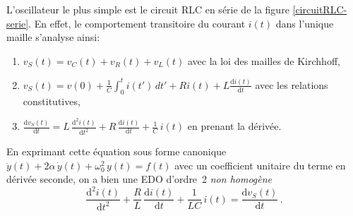 \documentclass[canadien,12pt,oneside,letterpaper]{article}
\begin{document}
L'oscillateur le plus simple est le circuit RLC en série de la figure \ref{circuitRLC-serie}. En effet, le comportement transitoire du courant $i(t)$ dans l'unique maille s'analyse ainsi:
\begin{enumerate}
    \item $v_S(t)=v_C(t)+v_R(t)+v_L(t)$ avec la loi des mailles de Kirchhoff,
    \item $\displaystyle v_S(t)=v(0)+\frac{1}{C}\int_0^ti(t')\,dt'+Ri(t)+L\frac{\mathrm{d}i(t)}{\mathrm{d}t}$ avec les relations constitutives,
  \item $\displaystyle \frac{\mathrm{d}v_S(t)}{\mathrm{d}t} = L\,\frac{\mathrm{d}^2i(t)}{\mathrm{d}t^2}+R\,\frac{\mathrm{d}i(t)}{\mathrm{d}t}+\frac{1}{C}\,i(t)$ en prenant la dérivée.
\end{enumerate}
En exprimant cette équation sous forme canonique $\ddot y(t) + 2\alpha\,\dot y(t) + \omega_0^2\,y(t) = f(t)$ avec un coefficient unitaire du terme en dérivée seconde, on a bien une EDO d'ordre~2 \textit{non homogène}
\begin{equation}\label{eq:RCL}
    \frac{\mathrm{d}^2i(t)}{\mathrm{d}t^2}+\frac{R}{L}\,\frac{\mathrm{d}i(t)}{\mathrm{d}t}+\frac{1}{LC}\,i(t) = \frac{\mathrm{d}v_S(t)}{\mathrm{d}t}\,.
\end{equation}
\end{document}
